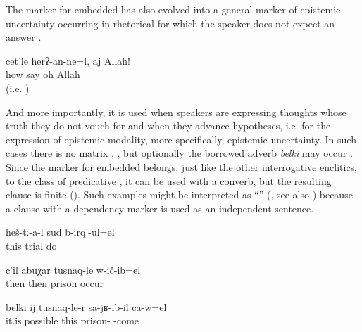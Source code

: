 The marker for embedded  has also evolved into a general marker of epistemic uncertainty occurring in rhetorical  for which the speaker does not expect an answer .
%
\begin{exe}
	\ex	\label{ex:How should this be said, oh, Allah!A}
	\gll	cet'le	herʔ-an-ne=l,	aj	Allah!\\
		how	say	oh	Allah\\
	\glt	{} (i.e. )
\end{exe}

And more importantly, it is used when speakers are expressing thoughts whose truth they do not vouch for and when they advance hypotheses, i.e. for the expression of epistemic modality, more specifically, epistemic uncertainty. In such cases there is no matrix  , , but optionally the borrowed adverb \textit{belki} may occur . Since the marker for embedded  belongs, just like the other interrogative enclitics, to the class of predicative , it can be used with a converb, but the resulting clause is finite (). Such examples might be interpreted as ``'' (\citealp{Evans2007, EvansWatanabe2016}, see also \citealp{Mithun2008}) because a clause with a dependency marker is used as an independent sentence. 
%
\begin{exe}
	\ex	\label{ex:They are making a trial or what}
	\gll	heš-tː-a-l	sud	b-irq'-ul=el\\
		this	trial	do\\
	\glt	{}

	\ex	\label{ex:Then he went to prison or so / or what}
	\gll	c'il	abuχar	tusnaq-le	w-ič-ib=el\\
		then	then	prison	occur\\
	\glt	{}

	\ex	\label{ex:‎Maybe this is when he came from prison}
	\gll	belki	ij	tusnaq-le-r	sa-jʁ-ib-il	ca-w=el\\
		it.is.possible	this	prison-	-come	\\
	\glt	{}
\end{exe}

